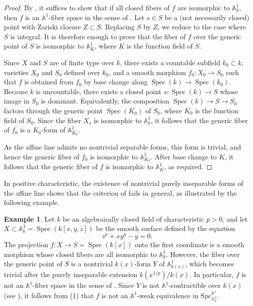 \documentclass[10pt]{amsart}
\renewcommand{\AA}{\mathbb{A}}
\newcommand{\Spec}{\operatorname{Spec}}
\numberwithin{equation}{section} %
\theoremstyle{plain}
\theoremstyle{definition}
\newtheorem{example}[example]{Example}
\theoremstyle{remark}
\begin{document}
\begin{proof}
By , it suffices to show that if all closed fibers of $f$ are isomorphic to $\AA^1_k$, then $f$ is an $\AA^1$-fiber space in the sense of . Let $s\in S$ be a (not necessarily closed) point with Zariski closure $Z\subset S$. Replacing $S$ by $Z$, we reduce to the case where $S$ is integral. It is therefore enough to prove that the fiber of $f$ over the generic point of $S$ is isomorphic to $\AA^1_K$, where $K$ is the function field of $S$.
\medskip

Since $X$ and $S$ are of finite type over $k$, there exists a countable subfield $k_0\subset k$, varieties $X_0$ and $S_0$ defined over $k_0$, and a smooth morphism $f_0:X_0\to S_0$ such that $f$ is obtained from $f_0$ by base change along $\Spec(k)\to \Spec(k_0)$. Because $k$ is uncountable, there exists a closed point $s:\Spec(k)\to S$ whose image in $S_0$ is dominant. Equivalently, the composition $\Spec(k)\to S\to S_0$ factors through the generic point $\Spec(K_0)$ of $S_0$, where $K_0$ is the function field of $S_0$. Since the fiber $X_s$ is isomorphic to $\AA^1_k$, it follows that the generic fiber of $f_0$ is a $K_0$-form of $\AA^1_{K_0}$. 
\medskip

As the affine line admits no nontrivial separable forms, this form is trivial, and hence the generic fiber of $f_0$ is isomorphic to $\AA^1_{K_0}$. After base change to $K$, it follows that the generic fiber of $f$ is isomorphic to $\AA^1_K$, as required.
\end{proof}

\medskip

In positive characteristic, the existence of nontrivial purely inseparable forms of the affine line shows that the criterion of  fails in general, as illustrated by the following example.

\begin{example}\label{exa:form-generic-fiber}
Let $k$ be an algebraically closed field of characteristic $p>0$, and let $X\subset \AA^3_k=\Spec(k[x,y,z])$ be the smooth surface defined by the equation
\[
z^p+xy^p-y =0.
\]
The projection $f:X\to S=\Spec(k[x])$ onto the first coordinate is a smooth morphism whose closed fibers are all isomorphic to $\AA^1_k$. However, the fiber over the generic point of $S$ is a nontrivial $k(x)$-form $Y$ of $\AA^1_{k(x)}$, which becomes trivial after the purely inseparable extension $k(x^{1/p})/k(x)$. In particular, $f$ is not an $\AA^1$-fiber space in the sense of . Since $Y$ is not $\AA^1$-contractible over $k(x)$ (see ), it follows from (1) that $f$ is not an $\AA^1$-weak equivalence in $\mathrm{Spc}_{\AA^1_k}^{\AA^1}$.
\end{example}
\end{document}
